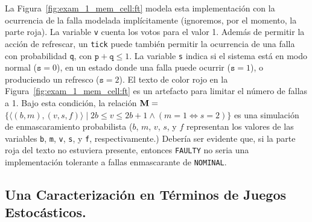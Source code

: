 %

%
La Figura~\ref{fig:exam_1_mem_cell:ft} modela esta implementación con la ocurrencia de la falla modelada implícitamente (ignoremos, por el momento, la parte roja).  La variable \texttt{v} cuenta los votos para el valor 1.
%
Además de permitir la acción de refrescar, un \texttt{tick} puede también permitir la ocurrencia de una falla con probabilidad \texttt{q}, con
$\texttt{p}+\texttt{q}\leq 1$.
%
La variable \texttt{s} indica si el sistema está en modo normal
($\texttt{s}=0$), en un estado donde una falla puede ocurrir ($\texttt{s}=1$),
o produciendo un refresco ($\texttt{s}=2$).
%
El texto de color rojo en la Figura~\ref{fig:exam_1_mem_cell:ft} es un artefacto para limitar el número de fallas a 1.  Bajo esta condición, la relación
%
$\mathbin{\mathbf{M}} = $ $\{{\langle(b,m),(v,s,f)\rangle} \mid {{2b\leq v\leq 2b{+}1} \wedge (m=1 \Leftrightarrow s=2)}\}$
%
es una simulación de enmascaramiento probabilista ($b$, $m$, $v$, $s$, y
$f$ representan los valores de las variables \texttt{b}, \texttt{m},
\texttt{v}, \texttt{s}, y \texttt{f}, respectivamente.)
%
Debería ser evidente que, si la parte roja del texto no estuviera presente, entonces
\texttt{FAULTY} no seria una implementación tolerante a fallas enmascarante de \texttt{NOMINAL}. 



\subsection{Una Caracterización en Términos de Juegos Estocásticos.}

